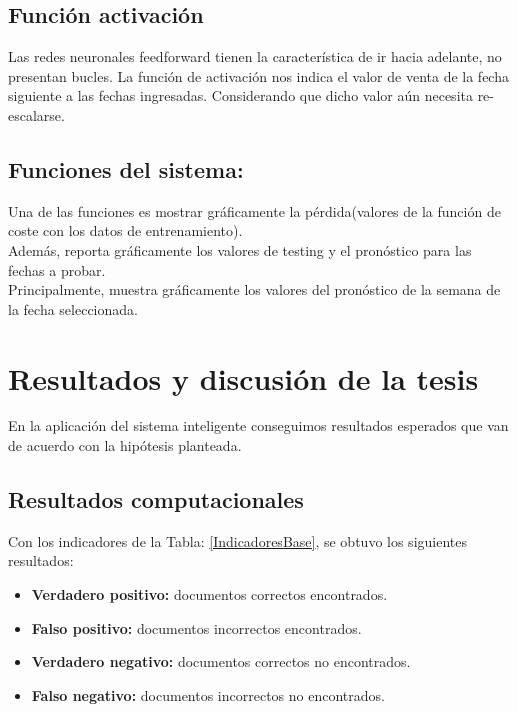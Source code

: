 \newpage
\section{Función activación}
Las redes neuronales feedforward tienen la característica de ir hacia adelante, no presentan bucles. La función de activación nos indica el valor de venta de la fecha siguiente a las fechas ingresadas. Considerando que dicho valor aún necesita re-escalarse.
\newpage

\section{Funciones del sistema:}

Una de las funciones es mostrar gráficamente la pérdida(valores de la función de coste con los datos de entrenamiento).\\
Además, reporta gráficamente los valores de testing y el pronóstico para las fechas a probar.\\
Principalmente, muestra gráficamente los valores del pronóstico de la semana de la fecha seleccionada.

\newpage


\chapter{Resultados y discusión de la tesis}

En la aplicación del sistema inteligente conseguimos resultados esperados que van de acuerdo con la hipótesis planteada.


\section{Resultados computacionales}
Con los indicadores de la Tabla: \ref{IndicadoresBase}, se obtuvo los siguientes resultados:
\begin{itemize}
\item \textbf{Verdadero positivo: }documentos correctos encontrados.
\item \textbf{Falso positivo: } documentos incorrectos encontrados.
\item \textbf{Verdadero negativo: } documentos correctos no encontrados.
\item \textbf{Falso negativo: } documentos incorrectos no encontrados.
\end{itemize}

